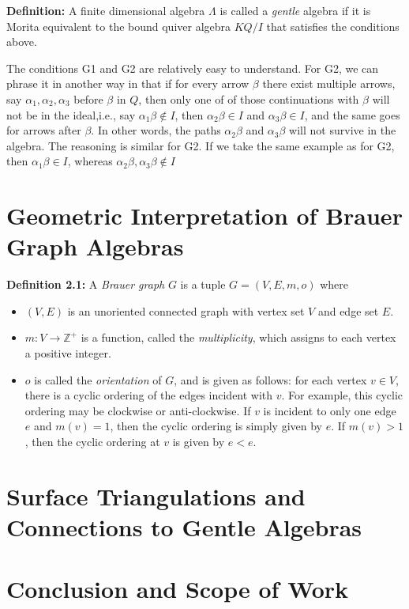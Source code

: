 \documentclass{report}
\theoremstyle{definition}
\numberwithin{figure}{section}
\begin{document}
 \textbf{Definition: } A finite dimensional algebra $\Lambda$ is called a \textit{gentle} algebra if it is Morita equivalent to the bound quiver algebra $KQ/I$ that satisfies the conditions above. 

 The conditions G1 and G2 are relatively easy to understand. For G2, we can phrase it in another way in that if for every arrow $\beta$ there exist multiple arrows, say $\alpha_1, \alpha_2,\alpha_3$ before $\beta$ in $Q$, then only one of of those continuations with $\beta$ will not be in the ideal,i.e., say $\alpha_1\beta\notin I$, then $\alpha_2\beta\in I$ and $\alpha_3\beta\in I$, and the same goes for arrows after $\beta$. In other words, the paths $\alpha_2\beta$ and $\alpha_3\beta$ will not survive in the algebra. The reasoning is similar for G2. If we take the same example as for G2, then $\alpha_1\beta \in I$, whereas $\alpha_2\beta, \alpha_3\beta\notin I$
 
\section{Geometric Interpretation of Brauer Graph Algebras}

\textbf{Definition 2.1: } A \textit{Brauer graph} $G$ is a tuple $G=(V,E,m,o)$ where 
\begin{itemize}
    \item $(V,E)$ is an unoriented connected graph with vertex set $V$ and edge set $E$.
    \item $m: V \to \mathbb{Z}^+$ is a function, called the \textit{multiplicity}, which assigns to each vertex a positive integer.
    \item $o$ is called the \textit{orientation} of $G$, and is given as follows: for each vertex $v \in V$, there is a cyclic ordering of the edges incident with $v$. For example, this cyclic ordering may be clockwise or anti-clockwise. If $v$ is incident to only one edge $e$ and $m(v)=1$, then the cyclic ordering is simply given by $e$. If $m(v) > 1$, then the cyclic ordering at $v$ is given by $e<e$.
\end{itemize}
\section{Surface Triangulations and Connections to Gentle Algebras}
\section{Conclusion and Scope of Work}
\end{document}

